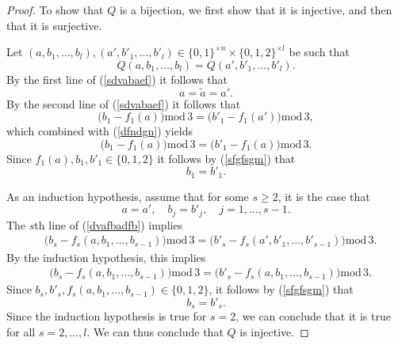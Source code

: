 \documentclass[a4paper,aps,floatfix]{revtex4}
\begin{document}
\begin{proof}
To show that $Q$ is a bijection, we first show that it is injective, and then that it is surjective.


Let $(a,b_1,\ldots,b_l),(a',b'_1,\ldots,b'_l)\in \{0,1\}^{\times n}\times\{0,1,2\}^{\times l}$ be such that 
\begin{equation}
\label{dvafbadfb}
Q(a,b_1,\ldots,b_l)= Q(a',b'_1,\ldots,b'_l).
\end{equation}
By the first line of (\ref{sdvabaef}) it follows that 
\begin{equation}
\label{dfndgn}
a= \tilde{a} = a'.
\end{equation}
By the second line of (\ref{sdvabaef}) it follows that
\begin{equation}
  \big(b_1-f_1(a)\big)\mathrm{mod}\, 3 = \big(b'_1-f_1(a')\big)\mathrm{mod}\, 3,
\end{equation}
which combined with (\ref{dfndgn}) yields
\begin{equation}
  \big(b_1-f_1(a)\big)\mathrm{mod}\, 3 = \big(b'_1-f_1(a)\big)\mathrm{mod}\, 3.
\end{equation}
Since $f_1(a),b_1,b'_1\in\{0,1,2\}$ it follows by (\ref{sfgfsgm}) that  
\begin{equation}
b_1 = b'_1.
\end{equation}


As an induction hypothesis, assume that  for some $s\geq 2$, it is the case that 
\begin{equation}
a = a',\quad b_{j} = b'_{j},\quad j = 1,\ldots, s-1.
\end{equation}
The $s$th line of (\ref{dvafbadfb}) implies
\begin{equation}
\label{adbvsdfb}
\begin{split}
 & \big(b_s - f_s(a,b_1,\ldots, b_{s-1}) \big)\mathrm{mod}\, 3= \big(b'_s- f_s(a',b'_1,\ldots,b'_{s-1})\big)\mathrm{mod}\, 3.
\end{split}
\end{equation}
By the induction hypothesis, this implies
\begin{equation}
\begin{split}
 & \big(b_s - f_s(a,b_1,\ldots, b_{s-1}) \big)\mathrm{mod}\, 3= \big(b'_s- f_s(a,b_1,\ldots,b_{s-1})\big)\mathrm{mod}\, 3.
\end{split}
\end{equation}
Since $b_s,b'_s,f_s(a,b_1,\ldots,b_{s-1}) \in\{0,1,2\}$, it follows by (\ref{sfgfsgm}) that  
\begin{equation}
b_s = b'_s.
\end{equation}
Since the induction hypothesis is true for $s= 2$, we can conclude that it is true for all $s = 2,\ldots, l$. We can thus conclude that $Q$ is injective.



\end{proof}
\end{document}
